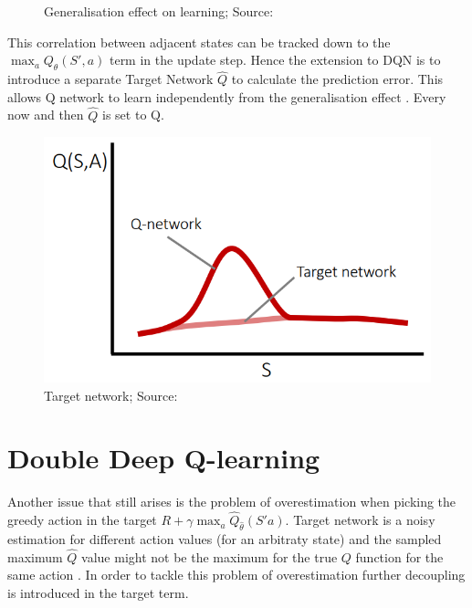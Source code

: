 \begin{figure}[H]
  \caption{Generalisation effect on learning; Source: \cite{lecture_dqn}}
  \label{fig:generalisation_curse}
\end{figure}

This correlation between adjacent states can be tracked down to the $\max_a Q_{\theta}(S', a)$ term in the update step. Hence the 
extension to DQN is to introduce a separate Target Network $\hat{Q}$ to calculate the prediction error. This allows Q network to learn independently from the generalisation effect \cite{lecture_dqn}. Every now and then $\hat{Q}$ is set to Q.

\begin{figure}[H]
\centering
\includegraphics[scale=0.4]{figures/target 0.PNG}
  \caption{Target network; Source: \cite{lecture_dqn}}
  \label{fig:target_network}
\end{figure}



\section{Double Deep Q-learning}
Another issue that still arises is the problem of overestimation when picking the greedy action in the target $R + \gamma \max_a \hat{Q}_{\hat{\theta}}(S' a)$. Target network is a noisy estimation for different action values (for an arbitraty state) and the sampled maximum $\hat{Q}$ value might not be the maximum for the true $Q$ function for the same action \cite{lecture_dqn}. In order to tackle this problem of overestimation 
further decoupling is introduced in the target term.\\

